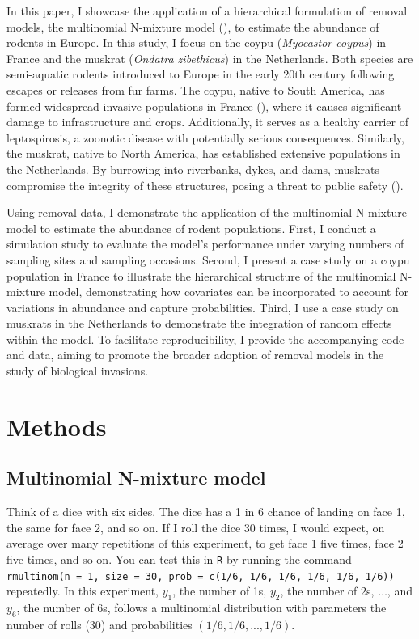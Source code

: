 \documentclass[
  11pt,
  a4paper,
]{article}
\begin{document}
In this paper, I showcase the application of a hierarchical formulation of removal models, the multinomial N-mixture model (), to estimate the abundance of rodents in Europe. In this study, I focus on the coypu (\emph{Myocastor coypus}) in France and the muskrat (\emph{Ondatra zibethicus}) in the Netherlands. Both species are semi-aquatic rodents introduced to Europe in the early 20th century following escapes or releases from fur farms. The coypu, native to South America, has formed widespread invasive populations in France (), where it causes significant damage to infrastructure and crops. Additionally, it serves as a healthy carrier of leptospirosis, a zoonotic disease with potentially serious consequences. Similarly, the muskrat, native to North America, has established extensive populations in the Netherlands. By burrowing into riverbanks, dykes, and dams, muskrats compromise the integrity of these structures, posing a threat to public safety ().

Using removal data, I demonstrate the application of the multinomial N-mixture model to estimate the abundance of rodent populations. First, I conduct a simulation study to evaluate the model's performance under varying numbers of sampling sites and sampling occasions. Second, I present a case study on a coypu population in France to illustrate the hierarchical structure of the multinomial N-mixture model, demonstrating how covariates can be incorporated to account for variations in abundance and capture probabilities. Third, I use a case study on muskrats in the Netherlands to demonstrate the integration of random effects within the model. To facilitate reproducibility, I provide the accompanying code and data, aiming to promote the broader adoption of removal models in the study of biological invasions.

\section{Methods}\label{methods}

\subsection{Multinomial N-mixture model}\label{multinomial-n-mixture-model}

Think of a dice with six sides. The dice has a 1 in 6 chance of landing on face 1, the same for face 2, and so on. If I roll the dice 30 times, I would expect, on average over many repetitions of this experiment, to get face 1 five times, face 2 five times, and so on. You can test this in \texttt{R} by running the command \texttt{rmultinom(n\ =\ 1,\ size\ =\ 30,\ prob\ =\ c(1/6,\ 1/6,\ 1/6,\ 1/6,\ 1/6,\ 1/6))} repeatedly. In this experiment, \(y_1\), the number of 1s, \(y_2\), the number of 2s, \(\ldots\), and \(y_6\), the number of 6s, follows a multinomial distribution with parameters the number of rolls (30) and probabilities \((1/6, 1/6, ..., 1/6)\).
\end{document}

